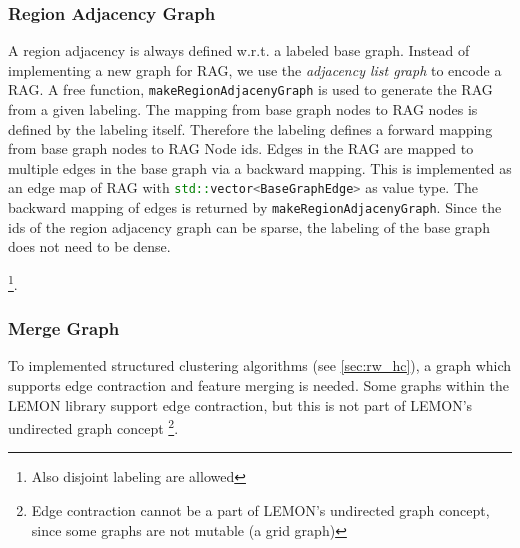 \subsubsection{Region Adjacency Graph} \label{sec:graphs_rag}

A region adjacency is always defined w.r.t. a labeled base graph.
Instead of implementing a new graph for RAG, we use
the \emph{adjacency list graph} to encode a RAG.
A free function, \lstinline[language=c++]{makeRegionAdjacenyGraph} 
is used to generate the RAG from a given labeling.
The mapping from base graph nodes to RAG nodes  is defined
by the labeling itself. Therefore
the labeling defines a forward mapping from base graph nodes
to RAG Node ids.
Edges in the RAG are mapped to multiple edges in the base graph
via a backward mapping.
This is implemented as an edge map of RAG with
\lstinline[language=c++]{std::vector<BaseGraphEdge>} as value type.
The backward mapping of edges is returned by \lstinline[language=c++]{makeRegionAdjacenyGraph}.
Since the ids of the region adjacency graph can be 
sparse, the labeling of the base graph does not need to be dense.


\footnote{Also disjoint labeling are allowed}.



\subsubsection{Merge Graph} \label{sec:graphs_merge_graph}

To implemented structured clustering algorithms (see \cref{sec:rw_hc}), 
a graph which supports edge contraction and feature merging is needed.
Some graphs within the LEMON library support 
edge contraction, but this is not part of LEMON's undirected graph concept \footnote{
Edge contraction cannot be a part of LEMON's undirected graph concept, since some graphs
are not mutable (\eg a grid graph)}.

